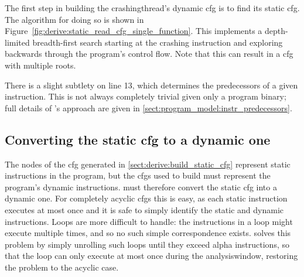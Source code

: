 The first step in building the \gls{crashingthread}'s dynamic
\gls{cfg} is to find its static \gls{cfg}.  The algorithm for doing so
is shown in Figure~\ref{fig:derive:static_read_cfg_single_function}.
This implements a depth-limited breadth-first search starting at the
crashing instruction and exploring backwards through the program's
control flow.  Note that this can result in a \gls{cfg} with multiple
roots.

There is a slight subtlety on line 13, which determines the
predecessors of a given instruction.  This is not always completely
trivial given only a program binary; full details of {\technique}'s
approach are given in \autoref{sect:program_model:instr_predecessors}.

\subsection[Converting the static \glsentrytext{cfg} to a dynamic one]{Converting the static \gls{cfg} to a dynamic one}
\label{sect:derive:handling_loops}


The nodes of the \gls{cfg} generated in
\autoref{sect:derive:build_static_cfg} represent static instructions
in the program, but the \glspl{cfg} used to build {\StateMachines}
must represent the program's dynamic instructions.  {\Technique} must
therefore convert the static \gls{cfg} into a dynamic one.  For
completely acyclic \glspl{cfg} this is easy, as each static
instruction executes at most once and it is safe to simply identify
the static and dynamic instructions.  Loops are more difficult to
handle: the instructions in a loop might execute multiple times, and
so no such simple correspondence exists.  {\Technique} solves this
problem by simply unrolling such loops until they exceed \gls{alpha}
instructions, so that the loop can only execute at most once during
the \gls{analysiswindow}, restoring the problem to the acyclic case.

